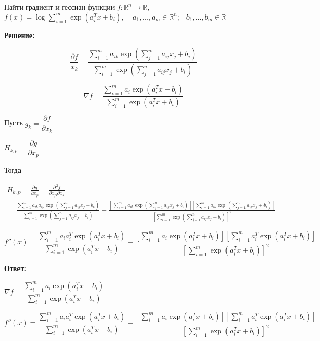\documentclass[a4paper,12pt]{article}
\newcommand{\lt}{\left}
\newcommand{\rt}{\right}
\newcommand{\p}{\partial}
\newcommand{\fr}{\frac}
\newcommand{\dfr}{\dfrac}
\begin{document}
\section{}

Найти градиент и гессиан функции $f : \mathbb{R}^n \to \mathbb{R}$, $f(x) = \log \sum\limits_{i=1}^m \exp (a_i^Tx + b_i), \;\;\;\; a_1, \ldots, a_m \in \mathbb{R}^n; \;\;\;  b_1, \ldots, b_m  \in \mathbb{R}$

\vspace{\baselineskip}

\textbf{Решение:}

\begin{equation}
\fr{\p f}{x_k} = \fr{\sum\limits_{i=1}^m a_{ik} \exp \lt(\sum\limits_{j=1}^n a_{ij}x_j + b_i\rt)}{\sum\limits_{i=1}^m \exp \lt(\sum\limits_{j=1}^n a_{ij}x_j + b_i\rt)}
\end{equation}

\begin{equation}
\nabla f = \fr{\sum\limits_{i=1}^m a_{i} \exp \lt(a_{i}^Tx + b_i\rt)}{\sum\limits_{i=1}^m \exp \lt(a_{i}^Tx + b_i\rt)}
\end{equation}

Пусть $g_k = \dfr{\p f}{\p x_k}$

$H_{k,p} = \dfr{\p g}{\p x_p}$

Тогда 

\begin{multline}
H_{k,p} = \fr{\p g}{\p x_p} = \fr{\p^2 f}{\p x_p \p x_k} =\\= \fr{\sum\limits_{i=1}^m a_{ik}a_{ip} \exp \lt(\sum\limits_{j=1}^n a_{ij}x_j + b_i\rt)}{\sum\limits_{i=1}^m \exp \lt(\sum\limits_{j=1}^n a_{ij}x_j + b_i\rt)} - \fr{\lt[\sum\limits_{i=1}^m a_{ik} \exp \lt(\sum\limits_{j=1}^n a_{ij}x_j + b_i\rt)\rt]\lt[\sum\limits_{i=1}^m a_{ik} \exp \lt(\sum\limits_{j=1}^n a_{ip}x_j + b_i\rt) \rt]}{\lt[\sum\limits_{i=1}^m \exp \lt(\sum\limits_{j=1}^n a_{ij}x_j + b_i\rt)\rt]^2}
\end{multline}

$$f''(x) = \fr{\sum\limits_{i=1}^m a_{i}a_{i}^T \exp \lt( a_{i}^Tx + b_i\rt)}{\sum\limits_{i=1}^m \exp \lt(a_{i}^Tx + b_i\rt)} - \fr{\lt[\sum\limits_{i=1}^m a_{i} \exp \lt( a_{i}^Tx + b_i\rt)\rt]\lt[\sum\limits_{i=1}^m a_{i}^T \exp \lt(a_{i}^Tx + b_i\rt) \rt]}{\lt[\sum\limits_{i=1}^m \exp \lt(a_{i}^Tx + b_i\rt)\rt]^2}$$

\textbf{Ответ:} 

$\nabla f = \dfr{\sum\limits_{i=1}^m a_{i} \exp \lt(a_{i}^Tx + b_i\rt)}{\sum\limits_{i=1}^m \exp \lt(a_{i}^Tx + b_i\rt)}$

$f''(x) = \dfr{\sum\limits_{i=1}^m a_{i}a_{i}^T \exp \lt( a_{i}^Tx + b_i\rt)}{\sum\limits_{i=1}^m \exp \lt(a_{i}^Tx + b_i\rt)} - \dfr{\lt[\sum\limits_{i=1}^m a_{i} \exp \lt( a_{i}^Tx + b_i\rt)\rt]\lt[\sum\limits_{i=1}^m a_{i}^T \exp \lt(a_{i}^Tx + b_i\rt) \rt]}{\lt[\sum\limits_{i=1}^m \exp \lt(a_{i}^Tx + b_i\rt)\rt]^2}$
\end{document}
